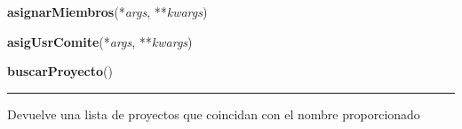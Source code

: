     \vspace{0.5ex}

\hspace{.8\funcindent}\begin{boxedminipage}{\funcwidth}

    \raggedright \textbf{asignarMiembros}(*\textit{args}, **\textit{kwargs})

\setlength{\parskip}{2ex}
\setlength{\parskip}{1ex}
    \end{boxedminipage}

    \label{app:vista:vistaProyecto:asigUsrComite}

    \vspace{0.5ex}

\hspace{.8\funcindent}\begin{boxedminipage}{\funcwidth}

    \raggedright \textbf{asigUsrComite}(*\textit{args}, **\textit{kwargs})

\setlength{\parskip}{2ex}
\setlength{\parskip}{1ex}
    \end{boxedminipage}

    \label{app:vista:vistaProyecto:buscarProyecto}

    \vspace{0.5ex}

\hspace{.8\funcindent}\begin{boxedminipage}{\funcwidth}

    \raggedright \textbf{buscarProyecto}()

    \vspace{-1.5ex}

    \rule{\textwidth}{0.5\fboxrule}
\setlength{\parskip}{2ex}
    Devuelve una lista de proyectos que coincidan con el nombre 
    proporcionado

\setlength{\parskip}{1ex}
    \end{boxedminipage}



